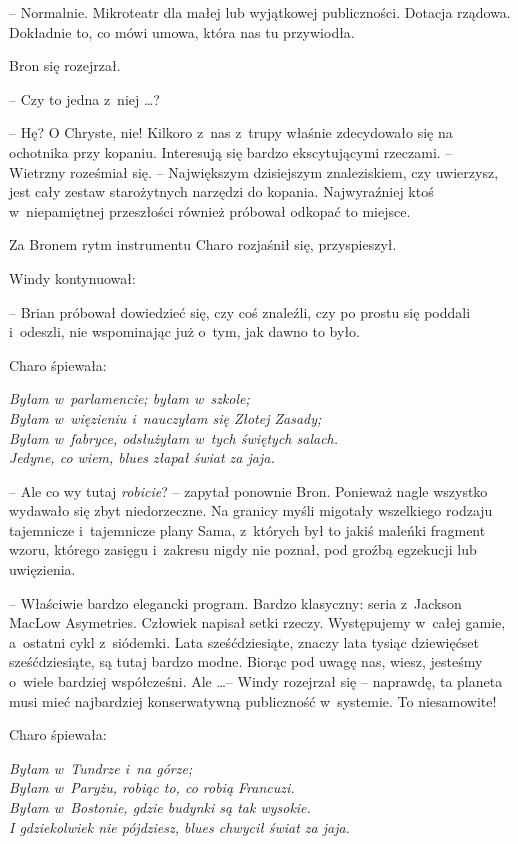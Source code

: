 \documentclass[oneside,polish,11pt,rmheadings]{mwbk}
\begin{document}
-- Normalnie. Mikroteatr dla małej lub wyjątkowej publiczności. Dotacja rządowa. Dokładnie to, co mówi umowa, która nas tu przywiodła. 

Bron się rozejrzał. 

-- Czy to jedna z~niej \ldots  ? 

-- Hę? O Chryste, nie! Kilkoro z~nas z~trupy właśnie zdecydowało się na ochotnika przy kopaniu. Interesują się bardzo ekscytującymi rzeczami. -- Wietrzny roześmiał się. -- Największym dzisiejszym znaleziskiem, czy uwierzysz, jest cały zestaw starożytnych narzędzi do kopania. Najwyraźniej ktoś w~niepamiętnej przeszłości również próbował odkopać to miejsce. 

Za Bronem rytm instrumentu Charo rozjaśnił się, przyspieszył. 

Windy kontynuował: 

-- Brian próbował dowiedzieć się, czy coś znaleźli, czy po prostu się poddali i~odeszli, nie wspominając już o~tym, jak dawno to było. 

Charo śpiewała: 

\noindent \textit{Byłam w~parlamencie; byłam w~szkole; \\ Byłam w~więzieniu i~nauczyłam się Złotej Zasady; \\ Byłam w~fabryce, odsłużyłam w~tych świętych salach. \\ Jedyne, co wiem, blues złapał świat za jaja. }

-- Ale co wy tutaj \textit{robicie}? -- zapytał ponownie Bron. Ponieważ nagle wszystko wydawało się zbyt niedorzeczne. Na granicy myśli migotały wszelkiego rodzaju tajemnicze i~tajemnicze plany Sama, z~których był to jakiś maleńki fragment wzoru, którego zasięgu i~zakresu nigdy nie poznał, pod groźbą egzekucji lub uwięzienia. 

-- Właściwie bardzo elegancki program. Bardzo klasyczny: seria z~Jackson MacLow Asymetries. Człowiek napisał setki rzeczy. Występujemy w~całej gamie, a~ostatni cykl z~siódemki. Lata sześćdziesiąte, znaczy lata tysiąc dziewięćset sześćdziesiąte, są tutaj bardzo modne. Biorąc pod uwagę nas, wiesz, jesteśmy o~wiele bardziej współcześni. Ale \ldots  -- Windy rozejrzał się -- naprawdę, ta planeta musi mieć najbardziej konserwatywną publiczność w~systemie. To niesamowite! 

Charo śpiewała: 

\noindent \textit{Byłam w~Tundrze i~na górze; \\
Byłam w~Paryżu, robiąc to, co robią Francuzi. \\
Byłam w~Bostonie, gdzie budynki są tak wysokie. \\
I gdziekolwiek nie pójdziesz, blues chwycił świat za jaja. }
\end{document}
